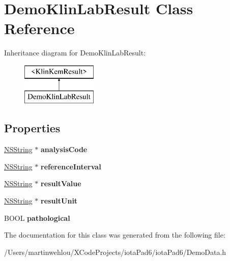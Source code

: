 \hypertarget{interface_demo_klin_lab_result}{
\section{DemoKlinLabResult Class Reference}
\label{interface_demo_klin_lab_result}
}
Inheritance diagram for DemoKlinLabResult:\begin{figure}[H]
\begin{center}
\leavevmode
\includegraphics[height=2.000000cm]{interface_demo_klin_lab_result}
\end{center}
\end{figure}
\subsection*{Properties}
\begin{DoxyCompactItemize}
\item 
\hypertarget{interface_demo_klin_lab_result_ac829ea853913ad733eeefdae23d58836}{
\hyperlink{class_n_s_string}{NSString} $\ast$ {\bfseries analysisCode}}
\label{interface_demo_klin_lab_result_ac829ea853913ad733eeefdae23d58836}

\item 
\hypertarget{interface_demo_klin_lab_result_a4f7f95b65e9a686388aa26faea80849f}{
\hyperlink{class_n_s_string}{NSString} $\ast$ {\bfseries referenceInterval}}
\label{interface_demo_klin_lab_result_a4f7f95b65e9a686388aa26faea80849f}

\item 
\hypertarget{interface_demo_klin_lab_result_a4a6d3cd8d273f6c0f3ab5532b7410929}{
\hyperlink{class_n_s_string}{NSString} $\ast$ {\bfseries resultValue}}
\label{interface_demo_klin_lab_result_a4a6d3cd8d273f6c0f3ab5532b7410929}

\item 
\hypertarget{interface_demo_klin_lab_result_a69b5ed1c1b2f4d2724bcf930b2865380}{
\hyperlink{class_n_s_string}{NSString} $\ast$ {\bfseries resultUnit}}
\label{interface_demo_klin_lab_result_a69b5ed1c1b2f4d2724bcf930b2865380}

\item 
\hypertarget{interface_demo_klin_lab_result_a67f58787205d22bafdf04767c22c9956}{
BOOL {\bfseries pathological}}
\label{interface_demo_klin_lab_result_a67f58787205d22bafdf04767c22c9956}

\end{DoxyCompactItemize}


The documentation for this class was generated from the following file:\begin{DoxyCompactItemize}
\item 
/Users/martinwehlou/XCodeProjects/iotaPad6/iotaPad6/DemoData.h\end{DoxyCompactItemize}
